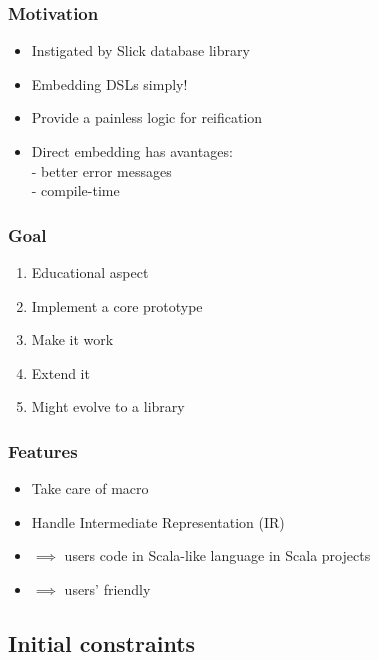 \documentclass{beamer}
\begin{document}

\begin{frame}
\frametitle{Motivation}
\begin{itemize}
\item Instigated by Slick database library
\item Embedding DSLs simply!
\item Provide a painless logic for reification
\item Direct embedding has avantages:\\
	- better error messages\\
	- compile-time\\
\end{itemize}
\end{frame}


\begin{frame}
\frametitle{Goal}
\begin{enumerate}
\item Educational aspect
\item Implement a core prototype
\item Make it work
\item Extend it
\item Might evolve to a library
\end{enumerate}
\end{frame}



\begin{frame}
\frametitle{Features}

\begin{itemize}
\item Take care of macro
\item Handle Intermediate Representation (IR)
\item $\implies$ users code in Scala-like language in Scala projects
\item $\implies$ users' friendly
\end{itemize}

\end{frame}


\subsection{Initial constraints}
\end{document}
